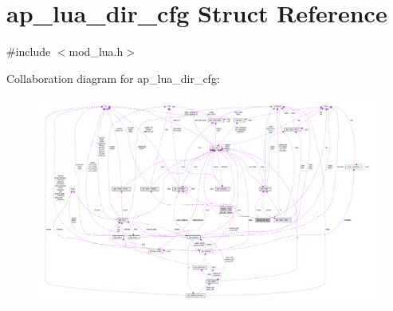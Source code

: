 \hypertarget{structap__lua__dir__cfg}{}\section{ap\+\_\+lua\+\_\+dir\+\_\+cfg Struct Reference}
\label{structap__lua__dir__cfg}


{\ttfamily \#include $<$mod\+\_\+lua.\+h$>$}



Collaboration diagram for ap\+\_\+lua\+\_\+dir\+\_\+cfg\+:
\nopagebreak
\begin{figure}[H]
\begin{center}
\leavevmode
\includegraphics[width=350pt]{structap__lua__dir__cfg__coll__graph}
\end{center}
\end{figure}
